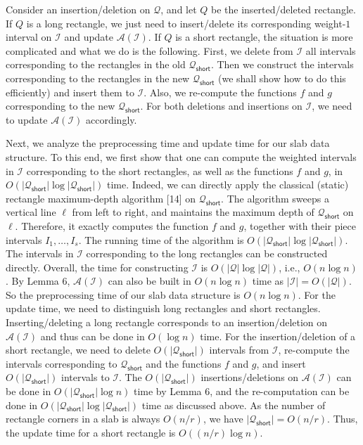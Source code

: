 \documentclass[10pt,a4paper]{article}
\begin{document}
\par
\par
Consider an insertion/deletion on $\mathcal{Q}$, and let $Q$ be the inserted/deleted rectangle. If $Q$ is a long rectangle, we just need to insert/delete its corresponding weight-$1$ interval on $\mathcal{I}$ and update $\mathcal{A}(\mathcal{I})$. If $Q$ is a short rectangle, the situation is more complicated and what we do is the following. First, we delete from $\mathcal{I}$ all intervals corresponding to the rectangles in the old $\mathcal{Q}_{\mathsf{short}}$. Then we construct the intervals corresponding to the rectangles in the new $\mathcal{Q}_{\mathsf{short}}$ (we shall show how to do this efficiently) and insert them to $\mathcal{I}$. Also, we re-compute the functions $f$ and $g$ corresponding to the new $\mathcal{Q}_{\mathsf{short}}$. For both deletions and insertions on $\mathcal{I}$, we need to update $\mathcal{A}(\mathcal{I})$ accordingly.
\par
\par
Next, we analyze the preprocessing time and update time for our slab data structure. To this end, we first show that one can compute the weighted intervals in $\mathcal{I}$ corresponding to the short rectangles, as well as the functions $f$ and $g$, in $O(|\mathcal{Q}_{\mathsf{short}}|\log|\mathcal{Q}_{\mathsf{short}}|)$ time. Indeed, we can directly apply the classical (static) rectangle maximum-depth algorithm [14] on $\mathcal{Q}_{\mathsf{short}}$. The algorithm sweeps a vertical line $\ell$ from left to right, and maintains the maximum depth of $\mathcal{Q}_{\mathsf{short}}$ on $\ell$. Therefore, it exactly computes the function $f$ and $g$, together with their piece intervals $I_{1},\dots,I_{s}$. The running time of the algorithm is $O(|\mathcal{Q}_{\mathsf{short}}|\log|\mathcal{Q}_{\mathsf{short}}|)$. The intervals in $\mathcal{I}$ corresponding to the long rectangles can be constructed directly. Overall, the time for constructing $\mathcal{I}$ is $O(|\mathcal{Q}|\log|\mathcal{Q}|)$, i.e., $O(n\log n)$. By Lemma 6, $\mathcal{A}(\mathcal{I})$ can also be built in $O(n\log n)$ time as $|\mathcal{I}|=O(|\mathcal{Q}|)$. So the preprocessing time of our slab data structure is $O(n\log n)$. For the update time, we need to distinguish long rectangles and short rectangles. Inserting/deleting a long rectangle corresponds to an insertion/deletion on $\mathcal{A}(\mathcal{I})$ and thus can be done in $O(\log n)$ time. For the insertion/deletion of a short rectangle, we need to delete $O(|\mathcal{Q}_{\mathsf{short}}|)$ intervals from $\mathcal{I}$, re-compute the intervals corresponding to $\mathcal{Q}_{\mathsf{short}}$ and the functions $f$ and $g$, and insert $O(|\mathcal{Q}_{\mathsf{short}}|)$ intervals to $\mathcal{I}$. The $O(|\mathcal{Q}_{\mathsf{short}}|)$ insertions/deletions on $\mathcal{A}(\mathcal{I})$ can be done in $O(|\mathcal{Q}_{\mathsf{short}}|\log n)$ time by Lemma 6, and the re-computation can be done in $O(|\mathcal{Q}_{\mathsf{short}}|\log|\mathcal{Q}_{\mathsf{short}}|)$ time as discussed above. As the number of rectangle corners in a slab is always $O(n/r)$, we have $|\mathcal{Q}_{\mathsf{short}}|=O(n/r)$. Thus, the update time for a short rectangle is $O((n/r)\log n)$.
\end{document}
